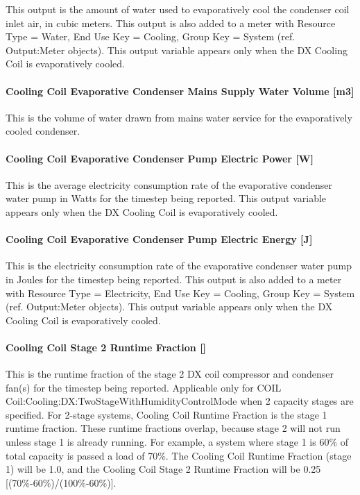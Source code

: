 This output is the amount of water used to evaporatively cool the condenser coil inlet air, in cubic meters. This output is also added to a meter with Resource Type = Water, End Use Key = Cooling, Group Key = System (ref. Output:Meter objects). This output variable appears only when the DX Cooling Coil is evaporatively cooled.

\paragraph{Cooling Coil Evaporative Condenser Mains Supply Water Volume {[}m3{]}}\label{cooling-coil-evaporative-condenser-mains-supply-water-volume-m3}

This is the volume of water drawn from mains water service for the evaporatively cooled condenser.

\paragraph{Cooling Coil Evaporative Condenser Pump Electric Power {[}W{]}}\label{cooling-coil-evaporative-condenser-pump-electric-power-w}

This is the average electricity consumption rate of the evaporative condenser water pump in Watts for the timestep being reported. This output variable appears only when the DX Cooling Coil is evaporatively cooled.

\paragraph{Cooling Coil Evaporative Condenser Pump Electric Energy {[}J{]}}\label{cooling-coil-evaporative-condenser-pump-electric-energy-j}

This is the electricity consumption rate of the evaporative condenser water pump in Joules for the timestep being reported. This output is also added to a meter with Resource Type = Electricity, End Use Key = Cooling, Group Key = System (ref. Output:Meter objects). This output variable appears only when the DX Cooling Coil is evaporatively cooled.

\paragraph{\texorpdfstring{Cooling Coil Stage 2 Runtime Fraction {[]}}{Cooling Coil Stage 2 Runtime Fraction }}\label{cooling-coil-stage-2-runtime-fraction}

This is the runtime fraction of the stage 2 DX coil compressor and condenser fan(s) for the timestep being reported. Applicable only for COIL Coil:Cooling:DX:TwoStageWithHumidityControlMode when 2 capacity stages are specified. For 2-stage systems, Cooling Coil Runtime Fraction is the stage 1 runtime fraction. These runtime fractions overlap, because stage 2 will not run unless stage 1 is already running. For example, a system where stage 1 is 60\% of total capacity is passed a load of 70\%. The Cooling Coil Runtime Fraction (stage 1) will be 1.0, and the Cooling Coil Stage 2 Runtime Fraction will be 0.25 {[}(70\%-60\%)/(100\%-60\%){]}.

